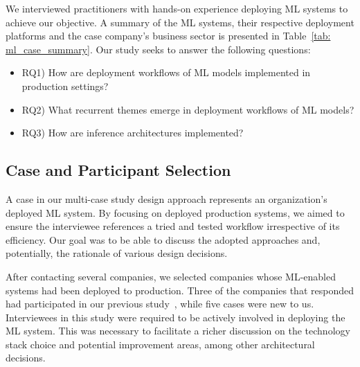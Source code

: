 We interviewed practitioners with hands-on experience deploying ML systems to achieve our objective. A summary of the ML systems, 
their respective deployment platforms and the case company's business sector is presented in Table~\ref{tab: ml_case_summary}. Our study seeks to answer the following questions:
\begin{itemize}
    \item RQ1) How are deployment workflows of ML models implemented in production settings?
    \item RQ2) What recurrent themes emerge in deployment workflows of ML models? %
    \item RQ3) How are inference architectures implemented?
\end{itemize}

\subsection{Case and Participant Selection}
A case in our multi-case study design approach represents an organization's deployed ML system. By focusing on deployed production systems, we aimed to ensure the interviewee references a tried and tested workflow irrespective of its efficiency. Our goal was to be able to discuss the adopted approaches and, potentially, the rationale of various design decisions.

After contacting several companies, we selected companies whose ML-enabled systems had been deployed to production. Three of the companies that responded had participated in our previous study~\cite{muiruri2022practices}, while five cases were new to us. Interviewees in this study were required to be actively involved in deploying the ML system. This was necessary to facilitate a richer discussion on the technology stack choice and potential improvement areas, among other architectural decisions.


